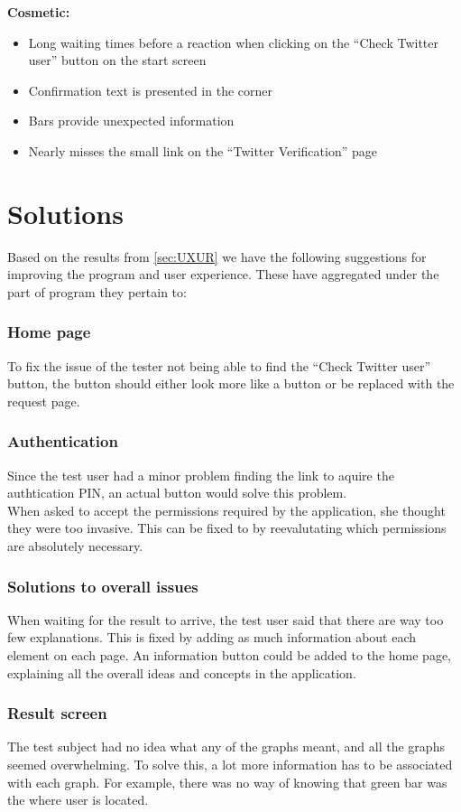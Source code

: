 \textbf{Cosmetic:}
\begin{itemize}
  \item Long waiting times before a reaction when clicking on the ``Check
  Twitter user'' button on the start screen
  \item Confirmation text is presented in the corner
  \item Bars provide unexpected information
  \item Nearly misses the small link on the ``Twitter Verification'' page 
\end{itemize}

\section{Solutions}
Based on the results from \autoref{sec:UXUR} we have the following suggestions
for improving the program and user experience. These have aggregated under the
part of program they pertain to:

\subsubsection{Home page}
To fix the issue of the tester not being able to find the ``Check Twitter
user'' button, the button should either look more like a button or be replaced
with the request page.

\subsubsection{Authentication}
Since the test user had a minor problem finding the link to aquire the
authtication PIN, an actual button would solve this problem.\\
When asked to accept the permissions required by the application, she thought
they were too invasive. This can be fixed to by reevalutating which permissions
are absolutely necessary.

\subsubsection{Solutions to overall issues}
When waiting for the result to arrive, the test user said that there are way too
few explanations. This is fixed by adding as much information about each element
on each page. An information button could be added to the home page, explaining
all the overall ideas and concepts in the application.

\subsubsection{Result screen}
The test subject had no idea what any of the graphs meant, and all the graphs
seemed overwhelming. To solve this, a lot more information has to be
associated with each graph. For example, there was no way of knowing that green
bar was the where user is located. 
